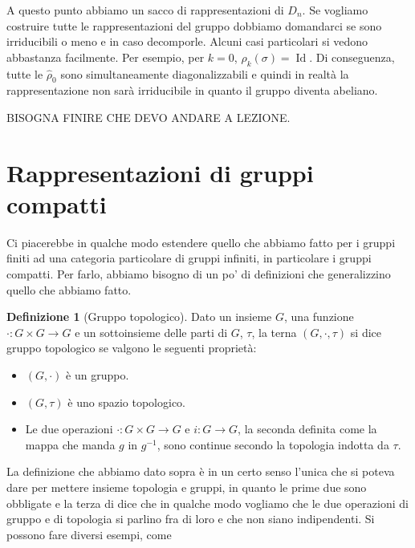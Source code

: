 \documentclass[11pt]{article}
\theoremstyle{plain}
\theoremstyle{definition}
\newtheorem{defn}{Definizione}[section]
\theoremstyle{remark}
\DeclareMathOperator{\Id}{Id}
\begin{document}
A questo punto abbiamo un sacco di rappresentazioni di $D_{n}$. Se vogliamo costruire tutte le rappresentazioni del gruppo dobbiamo domandarci se sono irriducibili o meno e in caso decomporle. Alcuni casi particolari si vedono abbastanza facilmente. Per esempio, per $k=0$, $\hat \rho_k(\sigma) = \Id$. Di conseguenza, tutte le $\hat \rho_0$ sono simultaneamente diagonalizzabili e quindi in realtà la rappresentazione non sarà irriducibile in quanto il gruppo diventa abeliano.



BISOGNA FINIRE CHE DEVO ANDARE A LEZIONE.






















\newpage
\section{Rappresentazioni di gruppi compatti}

Ci piacerebbe in qualche modo estendere quello che abbiamo fatto per i gruppi finiti ad una categoria particolare di gruppi infiniti, in particolare i gruppi compatti. Per farlo, abbiamo bisogno di un po' di definizioni che generalizzino quello che abbiamo fatto.


\begin{defn}[Gruppo topologico] Dato un insieme $G$, una funzione $\cdot: G\times G \to G$ e un sottoinsieme delle parti di $G$, $\tau$, la terna $(G, \cdot, \tau)$ si dice gruppo topologico se valgono le seguenti proprietà:

\begin{itemize}
\item $(G, \cdot)$ è un gruppo.
\item $(G, \tau)$ è uno spazio topologico.
\item Le due operazioni $\cdot : G \times G \to G$ e $i: G \to G$, la seconda definita come la mappa che manda $g $ in $g^{-1}$,  sono continue secondo la topologia indotta da $\tau$.
\end{itemize}

\end{defn}


La definizione che abbiamo dato sopra è in un certo senso l'unica che si poteva dare per mettere insieme topologia e gruppi, in quanto le prime due sono obbligate e la terza di dice che in qualche modo vogliamo che le due operazioni di gruppo e di topologia si parlino fra di loro e che non siano indipendenti. Si possono fare diversi esempi, come
\end{document}
